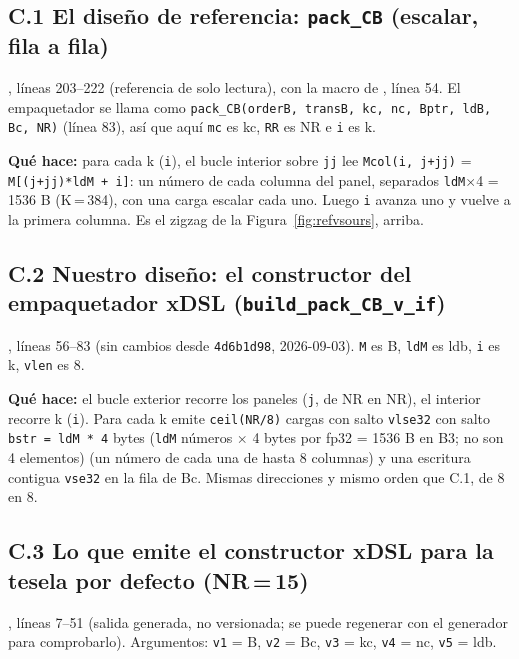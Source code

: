 \subsection*{C.1 El diseño de referencia: \texttt{pack\_CB} (escalar, fila a fila)}
, líneas 203--222 (referencia de solo lectura), con la macro de
, línea 54. El empaquetador se llama como \texttt{pack\_CB(orderB, transB, kc, nc, Bptr, ldB, Bc, NR)} (línea 83),
así que aquí \texttt{mc} es kc, \texttt{RR} es NR e \texttt{i} es k.

\textbf{Qué hace:} para cada k (\texttt{i}), el bucle interior sobre \texttt{jj} lee \texttt{Mcol(i, j+jj)} =
\texttt{M[(j+jj)*ldM + i]}: un número de cada columna del panel, separados \texttt{ldM}$\times$4 = 1536 B (K\,=\,384), con una carga
escalar cada uno. Luego \texttt{i} avanza uno y vuelve a la primera columna. Es el zigzag de la Figura~\ref{fig:refvsours}, arriba.

\subsection*{C.2 Nuestro diseño: el constructor del empaquetador xDSL (\texttt{build\_pack\_CB\_v\_if})}
, líneas 56--83 (sin cambios desde \texttt{4d6b1d98}, 2026-09-03). \texttt{M} es B,
\texttt{ldM} es ldb, \texttt{i} es k, \texttt{vlen} es 8.

\textbf{Qué hace:} el bucle exterior recorre los paneles (\texttt{j}, de NR en NR), el interior recorre k (\texttt{i}). Para cada k
emite \texttt{ceil(NR/8)} cargas con salto \texttt{vlse32} con salto \texttt{bstr = ldM * 4} bytes (\texttt{ldM} números $\times$ 4
bytes por fp32 = 1536 B en B3; no son 4 elementos) (un número de cada una de hasta 8 columnas) y una escritura contigua \texttt{vse32}
en la fila de Bc. Mismas direcciones y mismo orden que C.1, de 8 en 8.

\subsection*{C.3 Lo que emite el constructor xDSL para la tesela por defecto (NR\,=\,15)}
, líneas 7--51 (salida generada, no
versionada; se puede regenerar con el generador para comprobarlo). Argumentos: \texttt{v1} = B, \texttt{v2} = Bc, \texttt{v3} = kc,
\texttt{v4} = nc, \texttt{v5} = ldb.

